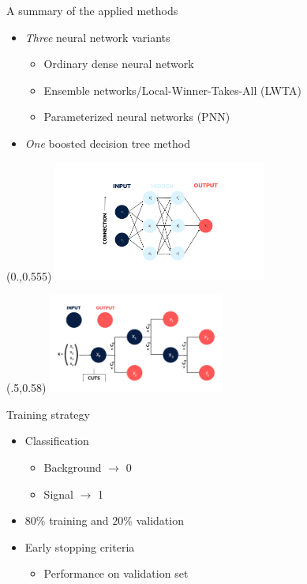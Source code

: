 \documentclass[UKenglish]{beamer}
\begin{document}
\begin{frame}{A summary of the applied methods}
    \begin{itemize}

    \item \emph{Three} neural network variants
    \begin{itemize}
        \item Ordinary dense neural network
        \item Ensemble networks/Local-Winner-Takes-All (LWTA)
        \item Parameterized neural networks (PNN)
    \end{itemize}

    \item \emph{One} boosted decision tree method

    \end{itemize}

    \begin{textblock}{1}(0.,0.555)
        \includegraphics[width=0.525\textwidth]{figures/Input_labels.png}
    \end{textblock}
    \begin{textblock}{1}(.5,0.58)
        \includegraphics[width=0.435\textwidth]{figures/DT.png}
    \end{textblock}
\end{frame}

\begin{frame}{Training strategy}
    \begin{itemize}
        \item Classification
        \begin{itemize}
            \item Background $\rightarrow$ 0 
            \item Signal $\rightarrow$ 1
        \end{itemize}
        \item $80\%$ training and $20\%$ validation 
        \item Early stopping criteria
        \begin{itemize}
            \item Performance on validation set 
        \end{itemize}
    \end{itemize}
\end{frame}
\end{document}
